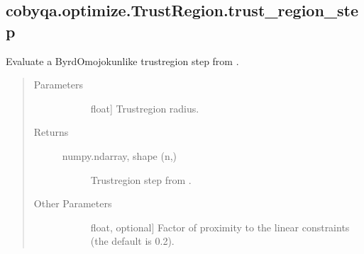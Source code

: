 \documentclass[letterpaper,10pt,english]{sphinxmanual}
\begin{document}
\begin{fulllineitems}
\begin{fulllineitems}
\begin{quote}
\begin{description}
\begin{description}
\end{description}

\end{description}\end{quote}

\end{fulllineitems}



\subsection{cobyqa.optimize.TrustRegion.trust\_region\_step}
\label{\detokenize{refs/generated/cobyqa.optimize.TrustRegion.trust_region_step:cobyqa-optimize-trustregion-trust-region-step}}\label{\detokenize{refs/generated/cobyqa.optimize.TrustRegion.trust_region_step::doc}}

\begin{fulllineitems}
\label{\detokenize{refs/generated/cobyqa.optimize.TrustRegion.trust_region_step:cobyqa.optimize.TrustRegion.trust_region_step}}
\sphinxAtStartPar
Evaluate a Byrd\sphinxhyphen{}Omojokun\sphinxhyphen{}like trust\sphinxhyphen{}region step from .
\begin{quote}\begin{description}
\item[{Parameters}] \leavevmode\begin{description}
\item[{}] \leavevmode{[}float{]}
\sphinxAtStartPar
Trust\sphinxhyphen{}region radius.

\end{description}

\item[{Returns}] \leavevmode\begin{description}
\item[{numpy.ndarray, shape (n,)}] \leavevmode
\sphinxAtStartPar
Trust\sphinxhyphen{}region step from .

\end{description}

\item[{Other Parameters}] \leavevmode\begin{description}
\item[{}] \leavevmode{[}float, optional{]}
\sphinxAtStartPar
Factor of proximity to the linear constraints (the default is 0.2).


\end{description}
\end{description}
\end{quote}
\end{fulllineitems}
\end{fulllineitems}
\end{document}
